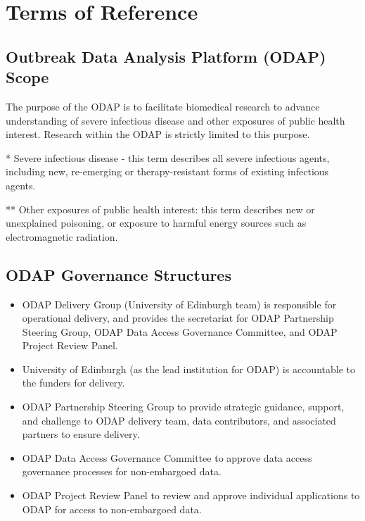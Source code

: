 \documentclass[
]{article}
\providecommand{\tightlist}{%
  \setlength{\itemsep}{0pt}\setlength{\parskip}{0pt}}\usepackage{longtable,booktabs,array}
\begin{document}
\vspace{1.4cm}\hypertarget{terms-of-reference}{%
\section{Terms of Reference}\label{terms-of-reference}}

\hypertarget{outbreak-data-analysis-platform-odap-scope}{%
\subsection{Outbreak Data Analysis Platform (ODAP)
Scope}\label{outbreak-data-analysis-platform-odap-scope}}

The purpose of the ODAP is to facilitate biomedical research to advance
understanding of severe infectious disease and other exposures of public
health interest. Research within the ODAP is strictly limited to this
purpose.

* Severe infectious disease - this term describes all severe infectious
agents, including new, re-emerging or therapy-resistant forms of
existing infectious agents.

** Other exposures of public health interest: this term describes new or
unexplained poisoning, or exposure to harmful energy sources such as
electromagnetic radiation.

\hypertarget{odap-governance-structures}{%
\subsection{ODAP Governance
Structures}\label{odap-governance-structures}}

\begin{itemize}
\tightlist
\item
  ODAP Delivery Group (University of Edinburgh team) is responsible for
  operational delivery, and provides the secretariat for ODAP
  Partnership Steering Group, ODAP Data Access Governance Committee, and
  ODAP Project Review Panel.
\item
  University of Edinburgh (as the lead institution for ODAP) is
  accountable to the funders for delivery.
\item
  ODAP Partnership Steering Group to provide strategic guidance,
  support, and challenge to ODAP delivery team, data contributors, and
  associated partners to ensure delivery.
\item
  ODAP Data Access Governance Committee to approve data access
  governance processes for non-embargoed data.
\item
  ODAP Project Review Panel to review and approve individual
  applications to ODAP for access to non-embargoed data.
\end{itemize}
\end{document}
